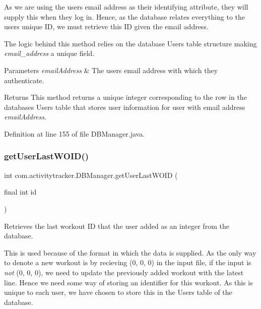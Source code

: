 As we are using the user\textquotesingle{}s email address as their identifying attribute, they will supply this when they log in. Hence, as the database relates everything to the user\textquotesingle{}s unique ID, we must retrieve this ID given the email address.

The logic behind this method relies on the database Users table structure making {\itshape email\+\_\+address} a unique field.


\begin{DoxyParams}{Parameters}
{\em email\+Address} & The user\textquotesingle{}s email address with which they authenticate.\\
\hline
\end{DoxyParams}
\begin{DoxyReturn}{Returns}
This method returns a unique integer corresponding to the row in the database\textquotesingle{}s Users table that stores user information for user with email address {\itshape email\+Address}. 
\end{DoxyReturn}


Definition at line 155 of file D\+B\+Manager.\+java.

\mbox{\label{classcom_1_1activitytracker_1_1_d_b_manager_a9a3f626218a0b97e26c21388c3780e81}} 
\subsubsection{\texorpdfstring{get\+User\+Last\+W\+O\+I\+D()}{getUserLastWOID()}}
{\footnotesize\ttfamily int com.\+activitytracker.\+D\+B\+Manager.\+get\+User\+Last\+W\+O\+ID (\begin{DoxyParamCaption}\item[{final int}]{id }\end{DoxyParamCaption})}

Retrieves the last workout ID that the user added as an integer from the database.

This is used because of the format in which the data is supplied. As the only way to denote a new workout is by recieving (0, 0, 0) in the input file, if the input is {\itshape not} (0, 0, 0), we need to update the previously added workout with the latest line. Hence we need some way of storing an identifier for this workout. As this is unique to each user, we have chosen to store this in the Users table of the database.


